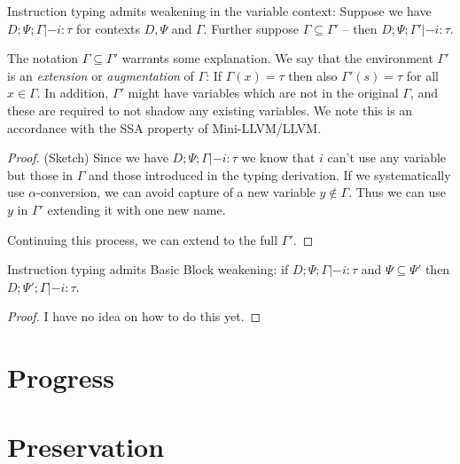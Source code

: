 \documentclass[a4paper, oneside, 10pt, draft]{memoir}
\begin{document}
\begin{lem}
  \label{lem:weaken-gamma}
  Instruction typing admits weakening in the variable context: Suppose
  we have $D;\Psi;\Gamma |- i : \tau$ for contexts $D, \Psi$ and
  $\Gamma$. Further suppose $\Gamma \subseteq \Gamma'$ -- then
  $D;\Psi;\Gamma' |- i : \tau$.
\end{lem}
\begin{rem}
  The notation $\Gamma \subseteq \Gamma'$ warrants some
  explanation. We say that the environment $\Gamma'$ is an
  \emph{extension} or \emph{augmentation} of $\Gamma$: If $\Gamma(x) =
  \tau$ then also $\Gamma'(s) = \tau$ for all $x \in \Gamma$. In
  addition, $\Gamma'$ might have variables which are not in the
  original $\Gamma$, and these are required to not shadow any existing
  variables. We note this is an accordance with the SSA property of
  Mini-LLVM/LLVM.
\end{rem}
\begin{proof}(Sketch)
  Since we have $D;\Psi;\Gamma |- i : \tau$ we know that $i$ can't use
  any variable but those in $\Gamma$ and those introduced in the
  typing derivation. If we systematically use $\alpha$-conversion, we
  can avoid capture of a new variable $y \not \in \Gamma$. Thus we can
  use $y$ in $\Gamma'$ extending it with one new name.

  Continuing this process, we can extend to the full $\Gamma'$.
\end{proof}
\begin{lem}
  \label{lem:weaken-psi}
  Instruction typing admits Basic Block weakening: if $D;\Psi;\Gamma
  |- i : \tau$ and $\Psi \subseteq \Psi'$ then $D;\Psi';\Gamma |- i :
  \tau$.
\end{lem}
\begin{proof}
  I have no idea on how to do this yet.
\end{proof}
\section{Progress}
\section{Preservation}
\end{document}
